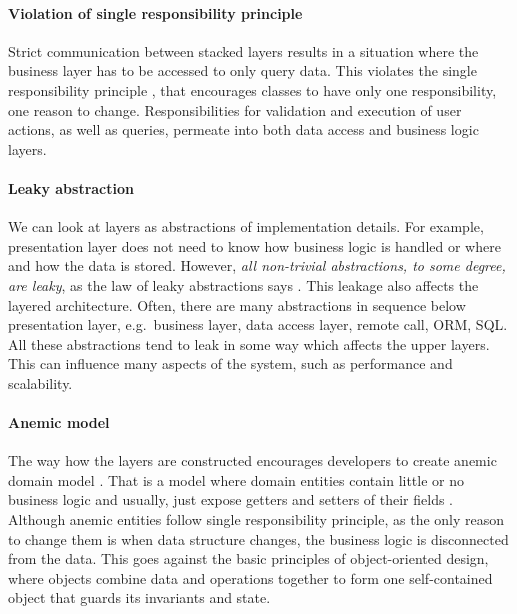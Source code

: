 \documentclass{book}
\begin{document}
\paragraph{Violation of single responsibility
principle}\label{violation-of-single-responsibility-principle}

Strict communication between stacked layers results in a situation where
the business layer has to be accessed to only query data. This violates
the single responsibility principle \cite{srp-violation}, that
encourages classes to have only one responsibility, one reason to
change. Responsibilities for validation and execution of user actions,
as well as queries, permeate into both data access and business logic
layers.

\paragraph{Leaky abstraction}\label{leaky-abstraction}

We can look at layers as abstractions of implementation details. For
example, presentation layer does not need to know how business logic is
handled or where and how the data is stored. However, \emph{all
non-trivial abstractions, to some degree, are leaky}, as the law of
leaky abstractions says \cite{leaky}. This leakage also affects the
layered architecture. Often, there are many abstractions in sequence
below presentation layer, e.g.~business layer, data access layer, remote
call, ORM, SQL. All these abstractions tend to leak in some way which
affects the upper layers. This can influence many aspects of the system,
such as performance and scalability.

\paragraph{Anemic model}\label{anemic-model}

The way how the layers are constructed encourages developers to create
anemic domain model \cite{layered-anemic}. That is a model where domain
entities contain little or no business logic and usually, just expose
getters and setters of their fields \cite{anemic}. Although anemic
entities follow single responsibility principle, as the only reason to
change them is when data structure changes, the business logic is
disconnected from the data. This goes against the basic principles of
object-oriented design, where objects combine data and operations
together to form one self-contained object that guards its invariants
and state.
\end{document}
